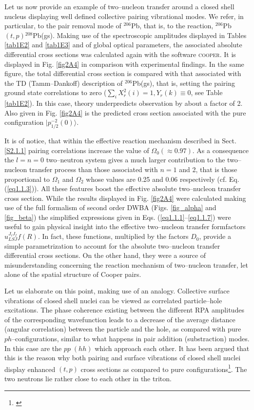 Let us now provide an example of two--nucleon transfer around a closed shell nucleus displaying well defined collective pairing vibrational modes. We refer, in particular, to the pair removal mode of $^{206}$Pb, that is, to the reaction, $^{206}$Pb$(t,p)$$^{208}$Pb(gs). Making use of the spectroscopic amplitudes displayed in Tables \ref{tab1E2} and \ref{tab1E3} and of global optical parameters, the associated  absolute differential cross sections was calculated again with the software \textsc{cooper}. It is displayed in Fig. \ref{fig2A4} in comparison with experimental findings. In  the same figure, the total differential cross section is compared with that associated with the TD (Tamm--Dankoff) description of $^{206}$Pb(gs), that is, setting the pairing ground state correlations to zero ($\sum_i X^2_r(i)=1, Y_r(k)\equiv 0$, see Table \ref{tab1E2}). In this case, theory underpredicts observation by about a factor of 2.  Also given in Fig. \ref{fig2A4} is the predicted cross section associated with the pure configuration $|p_{1/2}^{-2}(0)\rangle$. 


It is of notice, that within the effective reaction mechanism described in Sect. \ref{S2.1.1} pairing correlations increase the value of $\Omega_0(\approx 0.97)$. As a consequence the   $l=n=0$ two--neutron system gives a much larger contribution to the two--nucleon transfer process than those associated with $n=1$ and 2, that is those proportional to $\Omega_1$ and $\Omega_2$ whose values are 0.25 and 0.06 respectively (cf. Eq. (\ref{eq1.1.3})). All these features boost the effective absolute two--nucleon  transfer cross section. While the results displayed in Fig. \ref{fig2A4} were calculated making use of the full formalism of second order DWBA (Figs. \ref{fig_alpha} and \ref{fig_beta}) the simplified expressions given in Eqs. (\ref{eq1.1.1}--\ref{eq1.1.7}) were useful to gain physical insight into the effective  two--nucleon transfer formfactors $u^{J_iJ_f}_{LSJ}f(R)$. In fact, these functions, multiplied by the factors $D_0$, provide a simple parametrization to account for the absolute two--nucleon transfer  differential cross sections. On the other hand, they were a source of misunderstanding concerning the reaction mechanism of two--nucleon transfer, let alone of the spatial structure of Cooper pairs.


 Let us elaborate on this point, making use of an analogy. Collective surface vibrations of closed shell nuclei can be viewed as correlated particle--hole excitations. The phase coherence existing between the different RPA amplitudes of the corresponding wavefunction leads to a decrease of the average distance (angular correlation) between the particle and the hole, as compared with pure $ph$--configurations, similar to what happens in pair addition (substraction) modes. In this case are the $pp\;(hh)$ which approach each other. It has been argued that this is the reason why both pairing and surface vibrations of closed shell nuclei display enhanced $(t,p)$ cross sections as compared to pure configurations\footnote{\cite{Bertsch:67}}. The two neutrons lie rather close to each other in the triton.


